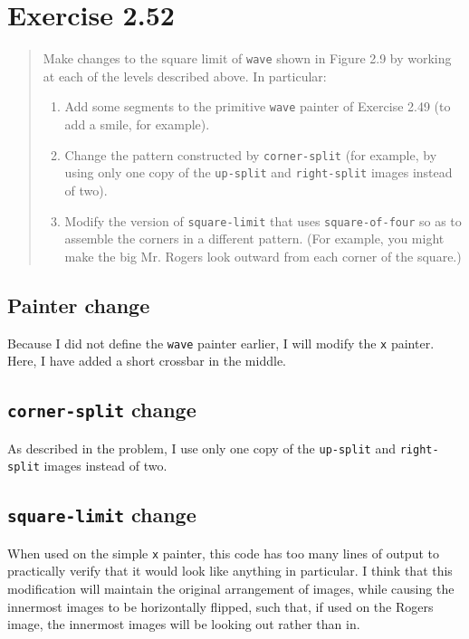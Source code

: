 \documentclass{article}
\begin{document}
\section{Exercise 2.52}
\begin{quote}
    Make changes to the square limit of \texttt{wave} shown in Figure 2.9 by
    working at each of the levels described above. In particular:
    \begin{enumerate}
        \item Add some segments to the primitive \texttt{wave} painter of
            Exercise 2.49 (to add a smile, for example).
        \item Change the pattern constructed by \texttt{corner-split} (for
            example, by using only one copy of the \texttt{up-split} and
            \texttt{right-split} images instead of two).
        \item Modify the version of \texttt{square-limit} that uses
            \texttt{square-of-four} so as to assemble the corners in a
            different pattern. (For example, you might make the big Mr. Rogers
            look outward from each corner of the square.)
    \end{enumerate}
\end{quote}

\subsection{Painter change}
Because I did not define the \texttt{wave} painter earlier, I will modify the
\texttt{x} painter. Here, I have added a short crossbar in the middle.



\subsection{\texttt{corner-split} change}
As described in the problem, I use only one copy of the \texttt{up-split} and
\texttt{right-split} images instead of two.



\subsection{\texttt{square-limit} change}
When used on the simple \texttt{x} painter, this code has too many lines of
output to practically verify that it would look like anything in particular.
I think that this modification will maintain the original arrangement of images,
while causing the innermost images to be horizontally flipped, such that, if
used on the Rogers image, the innermost images will be looking out rather than
in.


\end{document}
